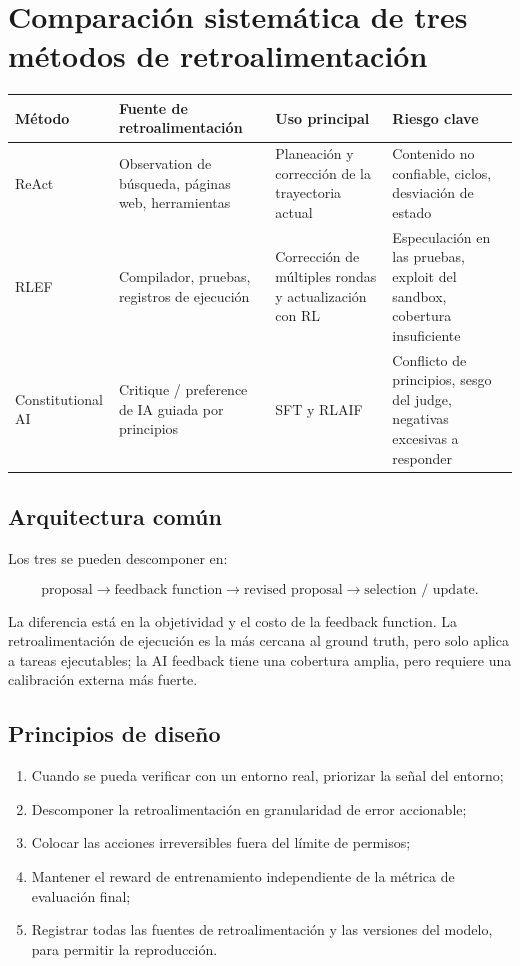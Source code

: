 \section{Comparación sistemática de tres métodos de retroalimentación}

\begin{table}[H]
\centering
\small
\begin{tabular}{>{\raggedright\arraybackslash}p{2.3cm}>{\raggedright\arraybackslash}p{3.4cm}>{\raggedright\arraybackslash}p{3.2cm}>{\raggedright\arraybackslash}p{4.2cm}}
\toprule
\textbf{Método} & \textbf{Fuente de retroalimentación} & \textbf{Uso principal} & \textbf{Riesgo clave} \\
\midrule
ReAct & Observation de búsqueda, páginas web, herramientas & Planeación y corrección de la trayectoria actual & Contenido no confiable, ciclos, desviación de estado \\
RLEF & Compilador, pruebas, registros de ejecución & Corrección de múltiples rondas y actualización con RL & Especulación en las pruebas, exploit del sandbox, cobertura insuficiente \\
Constitutional AI & Critique / preference de IA guiada por principios & SFT y RLAIF & Conflicto de principios, sesgo del judge, negativas excesivas a responder \\
\bottomrule
\end{tabular}
\end{table}

\subsection{Arquitectura común}

Los tres se pueden descomponer en:

$$
\text{proposal}\rightarrow\text{feedback function}
\rightarrow\text{revised proposal}\rightarrow\text{selection / update}.
$$

La diferencia está en la objetividad y el costo de la feedback function. La retroalimentación de ejecución es la más cercana al ground truth, pero solo aplica a tareas ejecutables; la AI feedback tiene una cobertura amplia, pero requiere una calibración externa más fuerte.

\subsection{Principios de diseño}

\begin{enumerate}
    \item Cuando se pueda verificar con un entorno real, priorizar la señal del entorno;
    \item Descomponer la retroalimentación en granularidad de error accionable;
    \item Colocar las acciones irreversibles fuera del límite de permisos;
    \item Mantener el reward de entrenamiento independiente de la métrica de evaluación final;
    \item Registrar todas las fuentes de retroalimentación y las versiones del modelo, para permitir la reproducción.
\end{enumerate}

